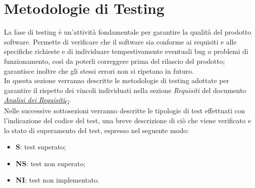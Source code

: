 \section{Metodologie di Testing}
La fase di testing è un'attività fondamentale per garantire la qualità del prodotto software. Permette di verificare che il software sia conforme ai requisiti e alle specifiche richieste e di individuare tempestivamente eventuali bug o problemi di funzionamento, così da poterli correggere prima del rilascio del prodotto; garantisce inoltre che gli stessi errori non si ripetano in futuro. \\
In questa sezione verranno descritte le metodologie di testing adottate per garantire il rispetto dei vincoli individuati nella sezione \textit{Requisiti} del documento \href{https://7last.github.io/docs/rtb/documentazione-esterna/analisi-dei-requisiti}{\href{https://7last.github.io/docs/rtb/documentazione-interna/glossario\#analisi-dei-requisiti}{\textit{Analisi dei Requisiti}\textsubscript{G}}}. \\ %
Nelle successive sottosezioni verranno descritte le tipologie di test effettuati con l'indicazione del codice del test, una breve descrizione di ciò che viene verificato e lo stato di superamento del test, espresso nel seguente modo: \\
\begin{itemize}
	\item \textbf{S}: test superato;
	\item \textbf{NS}: test non superato;
	\item \textbf{NI}: test non implementato.
\end{itemize}

